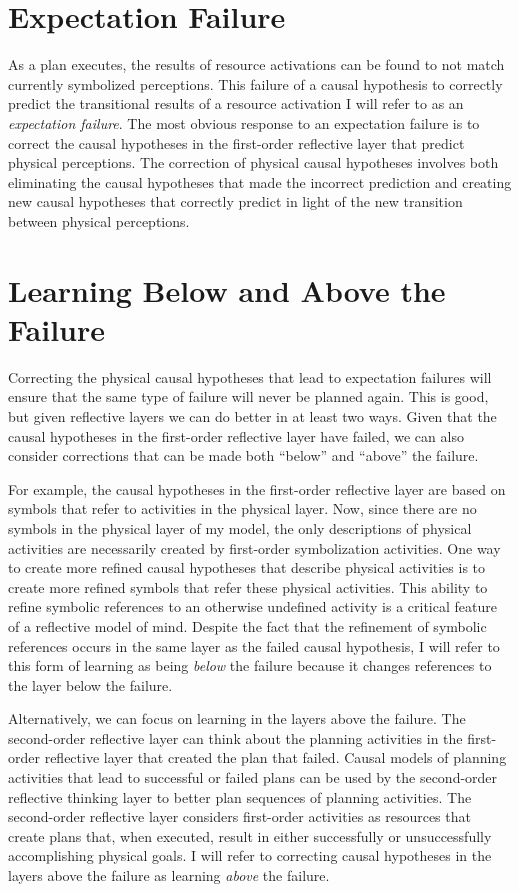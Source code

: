 \section{Expectation Failure}

As a plan executes, the results of resource activations can be found
to not match currently symbolized perceptions.  This failure of a
causal hypothesis to correctly predict the transitional results of a
resource activation I will refer to as an \emph{expectation failure}.
The most obvious response to an expectation failure is to correct the
causal hypotheses in the first-order reflective layer that predict
physical perceptions.  The correction of physical causal hypotheses
involves both eliminating the causal hypotheses that made the
incorrect prediction and creating new causal hypotheses that correctly
predict in light of the new transition between physical perceptions.

\section{Learning Below and Above the Failure}

Correcting the physical causal hypotheses that lead to expectation
failures will ensure that the same type of failure will never be
planned again.  This is good, but given reflective layers we can do
better in at least two ways.  Given that the causal hypotheses in the
first-order reflective layer have failed, we can also consider
corrections that can be made both ``below'' and ``above'' the failure.

For example, the causal hypotheses in the first-order reflective layer
are based on symbols that refer to activities in the physical layer.
Now, since there are no symbols in the physical layer of my model, the
only descriptions of physical activities are necessarily created by
first-order symbolization activities.  One way to create more refined
causal hypotheses that describe physical activities is to create more
refined symbols that refer these physical activities.  This ability to
refine symbolic references to an otherwise undefined activity is a
critical feature of a reflective model of mind.  Despite the fact that
the refinement of symbolic references occurs in the same layer as the
failed causal hypothesis, I will refer to this form of learning as
being \emph{below} the failure because it changes references to the
layer below the failure.

Alternatively, we can focus on learning in the layers above the
failure.  The second-order reflective layer can think about the
planning activities in the first-order reflective layer that created
the plan that failed.  Causal models of planning activities that lead
to successful or failed plans can be used by the second-order
reflective thinking layer to better plan sequences of planning
activities.  The second-order reflective layer considers first-order
activities as resources that create plans that, when executed, result
in either successfully or unsuccessfully accomplishing physical goals.
I will refer to correcting causal hypotheses in the layers above the
failure as learning \emph{above} the failure.

